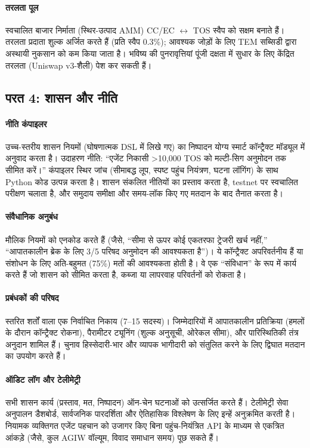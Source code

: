 \documentclass[11pt]{article}
\begin{document}
\paragraph{तरलता पूल} स्वचालित बाजार निर्माता (स्थिर-उत्पाद AMM) CC/EC $\leftrightarrow$ TOS स्वैप को सक्षम बनाते हैं। तरलता प्रदाता शुल्क अर्जित करते हैं (प्रति स्वैप 0.3\%); आवश्यक जोड़ों के लिए TEM सब्सिडी द्वारा अस्थायी नुकसान को कम किया जाता है। भविष्य की पुनरावृत्तियां पूंजी दक्षता में सुधार के लिए केंद्रित तरलता (Uniswap v3-शैली) पेश कर सकती हैं।

\subsection{परत 4: शासन और नीति}
\paragraph{नीति कंपाइलर} उच्च-स्तरीय शासन नियमों (घोषणात्मक DSL में लिखे गए) का निष्पादन योग्य स्मार्ट कॉन्ट्रैक्ट मॉड्यूल में अनुवाद करता है। उदाहरण नीति: ``एजेंट निकासी >10,000 TOS को मल्टी-सिग अनुमोदन तक सीमित करें।'' कंपाइलर स्थिर जांच (सीमाबद्ध लूप, स्पष्ट पहुंच नियंत्रण, घटना लॉगिंग) के साथ Python कोड उत्पन्न करता है। शासन संकलित नीतियों का प्रस्ताव करता है, testnet पर स्वचालित परीक्षण चलाता है, और समुदाय समीक्षा और समय-लॉक किए गए मतदान के बाद तैनात करता है।

\paragraph{संवैधानिक अनुबंध} मौलिक नियमों को एनकोड करते हैं (जैसे, ``सीमा से ऊपर कोई एकतरफा ट्रेजरी खर्च नहीं,'' ``आपातकालीन ब्रेक के लिए 3/5 परिषद अनुमोदन की आवश्यकता है'')। ये कॉन्ट्रैक्ट अपरिवर्तनीय हैं या संशोधन के लिए अति-बहुमत (75\%) मतों की आवश्यकता होती है। वे एक ``संविधान'' के रूप में कार्य करते हैं जो शासन को सीमित करता है, कब्जा या लापरवाह परिवर्तनों को रोकता है।

\paragraph{प्रबंधकों की परिषद} स्तरित शर्तों वाला एक निर्वाचित निकाय (7--15 सदस्य)। जिम्मेदारियों में आपातकालीन प्रतिक्रिया (हमलों के दौरान कॉन्ट्रैक्ट रोकना), पैरामीटर ट्यूनिंग (शुल्क अनुसूची, ओरेकल सीमा), और पारिस्थितिकी तंत्र अनुदान शामिल हैं। चुनाव हिस्सेदारी-भार और व्यापक भागीदारी को संतुलित करने के लिए द्विघात मतदान का उपयोग करते हैं।

\paragraph{ऑडिट लॉग और टेलीमेट्री} सभी शासन कार्य (प्रस्ताव, मत, निष्पादन) ऑन-चेन घटनाओं को उत्सर्जित करते हैं। टेलीमेट्री सेवा अनुपालन डैशबोर्ड, सार्वजनिक पारदर्शिता और ऐतिहासिक विश्लेषण के लिए इन्हें अनुक्रमित करती है। नियामक व्यक्तिगत एजेंट पहचान को उजागर किए बिना पहुंच-नियंत्रित API के माध्यम से एकत्रित आंकड़े (जैसे, कुल AGIW वॉल्यूम, विवाद समाधान समय) पूछ सकते हैं।
\end{document}

